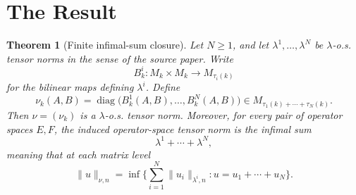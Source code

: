 \documentclass[11pt]{article}
\newtheorem{theorem}{Theorem}
\newcommand{\diag}{\operatorname{diag}}
\begin{document}
\section*{The Result}

\begin{theorem}[Finite infimal-sum closure]
Let \(N\ge 1\), and let \(\lambda^1,\ldots,\lambda^N\) be
\(\lambda\)-o.s. tensor norms in the sense of the source paper.  Write
\[
  B^i_k:M_k\times M_k\longrightarrow M_{\tau_i(k)}
\]
for the bilinear maps defining \(\lambda^i\).  Define
\[
  \nu_k(A,B)=\diag
  \big(B^1_k(A,B),\ldots,B^N_k(A,B)\big)
  \in M_{\tau_1(k)+\cdots+\tau_N(k)} .
\]
Then \(\nu=(\nu_k)\) is a \(\lambda\)-o.s. tensor norm.  Moreover, for every
pair of operator spaces \(E,F\), the induced operator-space tensor norm is the
infimal sum
\[
  \lambda^1+\cdots+\lambda^N,
\]
meaning that at each matrix level
\[
  \|u\|_{\nu,n}
  =
  \inf\Big\{
      \sum_{i=1}^N \|u_i\|_{\lambda^i,n}:
      u=u_1+\cdots+u_N
  \Big\}.
\]
\end{theorem}
\end{document}
